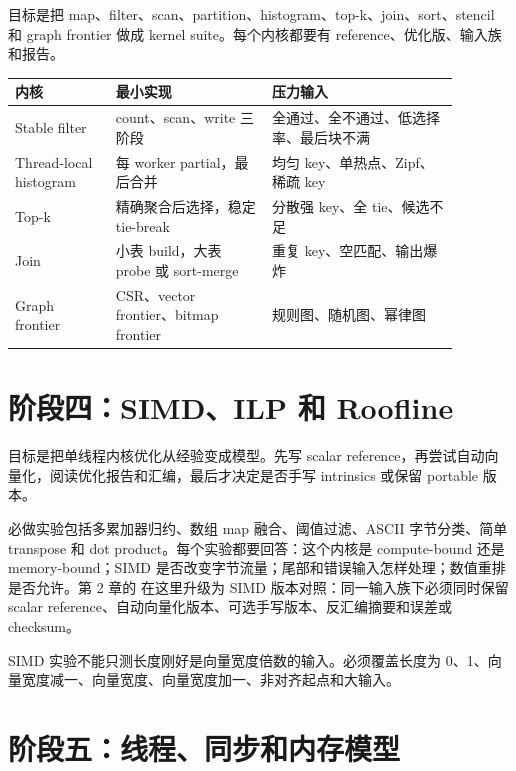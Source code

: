 目标是把 map、filter、scan、partition、histogram、top-k、join、sort、stencil 和 graph frontier 做成 kernel suite。每个内核都要有 reference、优化版、输入族和报告。

\begin{center}
\begin{tabular}{p{0.2\linewidth}p{0.31\linewidth}p{0.37\linewidth}}
\toprule
内核 & 最小实现 & 压力输入 \\
\midrule
Stable filter & count、scan、write 三阶段 & 全通过、全不通过、低选择率、最后块不满 \\
Thread-local histogram & 每 worker partial，最后合并 & 均匀 key、单热点、Zipf、稀疏 key \\
Top-k & 精确聚合后选择，稳定 tie-break & 分散强 key、全 tie、候选不足 \\
Join & 小表 build，大表 probe 或 sort-merge & 重复 key、空匹配、输出爆炸 \\
Graph frontier & CSR、vector frontier、bitmap frontier & 规则图、随机图、幂律图 \\
\bottomrule
\end{tabular}
\end{center}

\section{阶段四：SIMD、ILP 和 Roofline}

目标是把单线程内核优化从经验变成模型。先写 scalar reference，再尝试自动向量化，阅读优化报告和汇编，最后才决定是否手写 intrinsics 或保留 portable 版本。

必做实验包括多累加器归约、数组 map 融合、阈值过滤、ASCII 字节分类、简单 transpose 和 dot product。每个实验都要回答：这个内核是 compute-bound 还是 memory-bound；SIMD 是否改变字节流量；尾部和错误输入怎样处理；数值重排是否允许。第 2 章的  在这里升级为 SIMD 版本对照：同一输入族下必须同时保留 scalar reference、自动向量化版本、可选手写版本、反汇编摘要和误差或 checksum。

\begin{warningbox}
SIMD 实验不能只测长度刚好是向量宽度倍数的输入。必须覆盖长度为 0、1、向量宽度减一、向量宽度、向量宽度加一、非对齐起点和大输入。
\end{warningbox}

\section{阶段五：线程、同步和内存模型}

